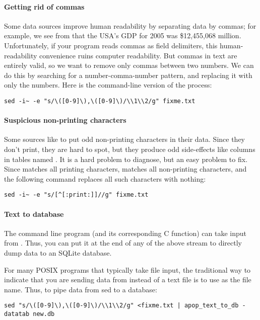 \paragraph{Getting rid of commas}
Some data sources improve human readability by separating data by
commas; for example, we see from  that the USA's GDP for
2005 was \$12,455,068 million. Unfortunately, if your program reads
commas as field delimiters, this human-readability convenience ruins
computer readability. But commas in text are entirely valid, so we want
to remove only commas between two numbers. We can do this by searching
for a number-comma-number pattern, and replacing it with only the
numbers. Here is the  command-line version of the process:
\begin{lstlisting}
sed -i~ -e "s/\([0-9]\),\([0-9]\)/\\1\\2/g" fixme.txt
\end{lstlisting}

\paragraph{Suspicious non-printing characters} Some sources like to
put odd non-printing characters in their data. Since they don't print,
they are hard to spot, but they produce odd side-effects like columns
in tables named . It is a hard
problem to diagnose, but an easy problem to fix. Since \bi{[:print:]}
matches all printing characters, \bi{[\that{}[:print:]]} matches all
non-printing characters, and the following command replaces all
such characters with nothing: 
\begin{lstlisting}
sed -i~ -e "s/[^[:print:]]//g" fixme.txt
\end{lstlisting}

\paragraph{Text to database}
The  command line program (and its corresponding
C function) can take input from . Thus, you can put it at the end of
any of the above stream to directly dump data to an SQLite database.

For many POSIX programs that typically take file input, the traditional
way to indicate that you are sending data from  instead of a text
file is to use \bi{-} as the file name. Thus, to pipe data from sed to a
database:
\begin{lstlisting}
sed "s/\([0-9]\),\([0-9]\)/\\1\\2/g" <fixme.txt | apop_text_to_db - datatab new.db
\end{lstlisting}

